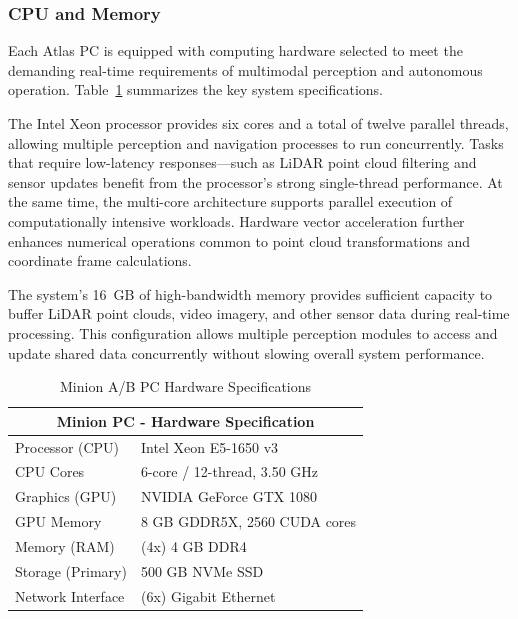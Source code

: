 \documentclass{erauthesis}
\begin{document}


\subsubsection{CPU and Memory}
Each Atlas PC is equipped with computing hardware selected to meet the demanding real-time requirements of multimodal perception and autonomous operation.  
Table~\ref{table:Minion_hardware} summarizes the key system specifications.

The Intel Xeon processor provides six cores and a total of twelve parallel threads, allowing multiple perception and navigation processes to run concurrently.  
Tasks that require low-latency responses—such as LiDAR point cloud filtering and sensor updates benefit from the processor’s strong single-thread performance.
At the same time, the multi-core architecture supports parallel execution of computationally intensive workloads.
Hardware vector acceleration further enhances numerical operations common to point cloud transformations and coordinate frame calculations.

The system’s 16~GB of high-bandwidth memory provides sufficient capacity to buffer LiDAR point clouds, video imagery, and other sensor data during real-time processing.  
This configuration allows multiple perception modules to access and update shared data concurrently without slowing overall system performance.

\begin{table}[htpb]
\centering
\begin{tabular}{ll}
\hline
\multicolumn{2}{c}{Minion PC - Hardware Specification} \\
\hline
\hline
Processor (CPU) & Intel Xeon E5-1650 v3 \\
CPU Cores & 6-core / 12-thread, 3.50 GHz \\
Graphics (GPU) & NVIDIA GeForce GTX 1080 \\
GPU Memory & 8 GB GDDR5X, 2560 CUDA cores \\
Memory (RAM) & (4x) 4 GB DDR4 \\
Storage (Primary) & 500 GB NVMe SSD \\
Network Interface & (6x) Gigabit Ethernet \\%
\hline
\end{tabular}
\caption{Minion A/B PC Hardware Specifications}
\label{table:Minion_hardware}
\end{table}
\end{document}
